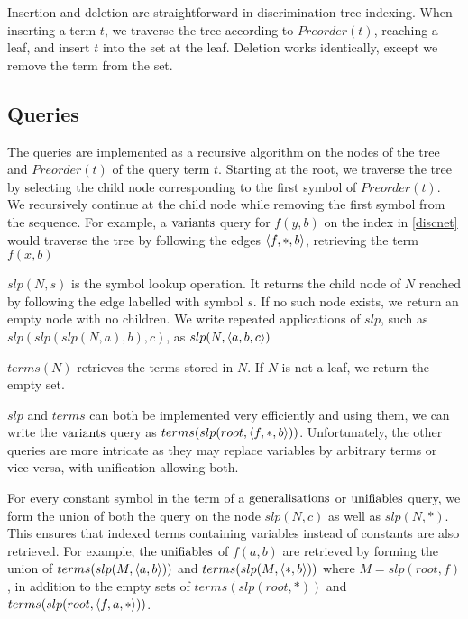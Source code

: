 Insertion and deletion are straightforward in discrimination tree indexing. When inserting a term $t$, we traverse the tree according to $Preorder(t)$, reaching a leaf, and insert $t$ into the set at the leaf. Deletion works identically, except we remove the term from the set.

\subsection{Queries}
The queries are implemented as a recursive algorithm on the nodes of the tree and $Preorder(t)$ of the query term $t$. Starting at the root, we traverse the tree by selecting the child node corresponding to the first symbol of $Preorder(t)$. We recursively continue at the child node while removing the first symbol from the sequence. For example, a $\mathrm{variants}$ query for $f(y,b)$ on the index in \cref{discnet} would traverse the tree by following the edges $\langle f,*,b \rangle$, retrieving the term $f(x,b)$

\begin{defn}
  $slp(N,s)$ is the symbol lookup operation. It returns the child node of $N$ reached by following the edge labelled with symbol $s$. If no such node exists, we return an empty node with no children. We write repeated applications of $slp$, such as $slp(slp(slp(N,a),b),c)$, as $slp(N, \langle a,b,c \rangle)$
\end{defn}
\begin{defn}
  $terms(N)$ retrieves the terms stored in $N$. If $N$ is not a leaf, we return the empty set.
\end{defn}


$slp$ and $terms$ can both be implemented very efficiently and using them, we can write the $\mathrm{variants}$ query as $terms(slp(root,\langle f,*,b \rangle))$. Unfortunately, the other queries are more intricate as they may replace variables by arbitrary terms or vice versa, with unification allowing both.

For every constant symbol in the term of a $\mathrm{generalisations}$ or $\mathrm{unifiables}$ query, we form the union of both the query on the node $slp(N,c)$ as well as $slp(N,*)$. This ensures that indexed terms containing variables instead of constants are also retrieved. For example, the $\mathrm{unifiables}$ of $f(a,b)$ are retrieved by forming the union of $terms(slp(M,\langle a,b \rangle))$ and $terms(slp(M,\langle *,b \rangle))$ where $M = slp(root,f)$, in addition to the empty sets of $terms(slp(root,*))$ and $terms(slp(root,\langle f,a,* \rangle))$.

